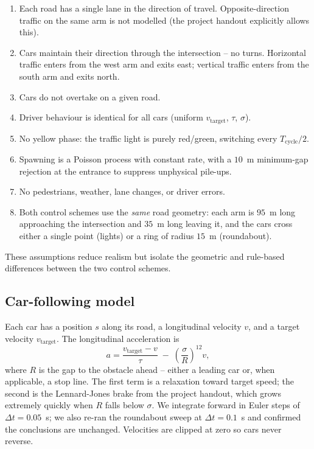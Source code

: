 \documentclass[11pt]{article}
\begin{document}
\begin{enumerate}
    \item Each road has a single lane in the direction of travel. Opposite-direction traffic on the same arm is not modelled (the project handout explicitly allows this).
    \item Cars maintain their direction through the intersection -- no turns. Horizontal traffic enters from the west arm and exits east; vertical traffic enters from the south arm and exits north.
    \item Cars do not overtake on a given road.
    \item Driver behaviour is identical for all cars (uniform $v_{\text{target}}$, $\tau$, $\sigma$).
    \item No yellow phase: the traffic light is purely red/green, switching every $T_{\text{cycle}}/2$.
    \item Spawning is a Poisson process with constant rate, with a $10$~m minimum-gap rejection at the entrance to suppress unphysical pile-ups.
    \item No pedestrians, weather, lane changes, or driver errors.
    \item Both control schemes use the \emph{same} road geometry: each arm is $95$~m long approaching the intersection and $35$~m long leaving it, and the cars cross either a single point (lights) or a ring of radius $15$~m (roundabout).
\end{enumerate}

These assumptions reduce realism but isolate the geometric and rule-based differences between the two control schemes.

\subsection{Car-following model}
Each car has a position $s$ along its road, a longitudinal velocity $v$, and a target velocity $v_{\text{target}}$. The longitudinal acceleration is
\begin{equation}
    a = \frac{v_{\text{target}} - v}{\tau} \;-\; \left(\frac{\sigma}{R}\right)^{12} v ,
    \label{eq:lj}
\end{equation}
where $R$ is the gap to the obstacle ahead -- either a leading car or, when applicable, a stop line. The first term is a relaxation toward target speed; the second is the Lennard-Jones brake from the project handout, which grows extremely quickly when $R$ falls below $\sigma$. We integrate forward in Euler steps of $\Delta t = 0.05$~s; we also re-ran the roundabout sweep at $\Delta t = 0.1$~s and confirmed the conclusions are unchanged. Velocities are clipped at zero so cars never reverse.
\end{document}
